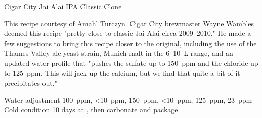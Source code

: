 \begin{recipie}{Cigar City Jai Alai IPA Classic Clone}

\begin{aboutblock}
This recipe courtesy of Amahl Turczyn. Cigar City brewmaster Wayne Wambles deemed
this recipe "pretty close to classic Jai Alai circa 2009--2010." He made a few
suggestions to bring this recipe closer to the original, including the use of
the Thames Valley ale yeast strain, Munich malt in the 6--10~L range, and an
updated water profile that "pushes the sulfate up to 150~ppm and the chloride
up to 125~ppm. This will jack up the calcium, but we find that quite a bit of
it precipitates out."
\end{aboutblock}


\begin{methodandtiming}
 
\begin{mashsteps}
\end{mashsteps}

\begin{fermentationsteps}
\end{fermentationsteps}

\begin{directions}
Water adjustment  100~ppm,  <10~ppm,  150~ppm,  <10~ppm,
 125~ppm,  23~ppm  Cold condition 10 days at , then carbonate
and package.
\end{directions}

\end{methodandtiming}

\pagebreak

\begin{ingredientsblock}

\begin{malts}
\end{malts}

\begin{hops}
\end{hops}


\end{ingredientsblock}
\end{recipie}
